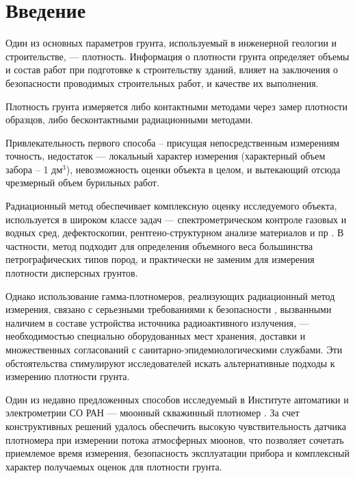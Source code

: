 \chapter*{Введение}							%

Один из основных параметров грунта, используемый в инженерной геологии и строительстве, ---
плотность. Информация о плотности грунта 
определяет объемы и состав работ при подготовке к строительству зданий, влияет на заключения о 
безопасности проводимых строительных работ, и качестве их выполнения\cite{gost5180, souzdornii}. 

Плотность грунта измеряется либо контактными методами через замер плотности образцов, 
либо бесконтактными радиационными методами.

Привлекательность первого способа – присущая непосредственным измерениям точность, недостаток ---
локальный характер измерения (характерный объем забора – 1 дм$^{3}$), невозможность оценки объекта в целом,
и вытекающий отсюда чрезмерный объем бурильных работ.

Радиационный метод обеспечивает комплексную оценку исследуемого объекта, используется в широком классе задач ---
спектрометрическом контроле газовых и водных сред, дефектоскопии, рентгено-структурном анализе материалов и пр \cite{gammaquant}. 
В частности, метод подходит для определения объемного веса большинства петрографических типов пород, и практически 
не заменим для измерения плотности дисперсных грунтов. 

Однако использование гамма-плотномеров, реализующих радиационный метод измерения, связано с серьезными требованиями 
к безопасности \cite{gost23061}, вызванными наличием в составе устройства источника радиоактивного излучения, --- необходимостью 
специально оборудованных мест хранения, доставки и множественных согласований с санитарно-эпидемиологическими службами. 
Эти обстоятельства стимулируют исследователей искать альтернативные подходы к измерению плотности грунта. 

Один из недавно предложенных способов исследуемый в Институте автоматики и электрометрии СО РАН ---
мюонный скважинный плотномер \cite{patentdensitometer}. За счет конструктивных решений удалось обеспечить высокую чувствительность 
датчика плотномера при измерении потока атмосферных мюонов, что позволяет сочетать приемлемое время измерения, 
безопасность эксплуатации прибора и комплексный характер получаемых оценок для плотности грунта.

